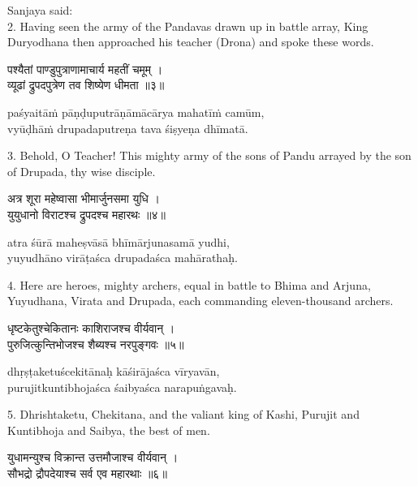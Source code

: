 Sanjaya said: \\
2. Having seen the army of the Pandavas drawn up in battle array, King
Duryodhana then approached his teacher (Drona) and spoke these words.

\begin{gitaverse}
पश्यैतां पाण्डुपुत्राणामाचार्य महतीं चमूम् । \\
व्यूढां द्रुपदपुत्रेण तव शिष्येण धीमता ॥३॥
\end{gitaverse}

\begin{transliteration}
paśyaitāṁ pāṇḍuputrāṇāmācārya mahatīṁ camūm, \\
vyūḍhāṁ drupadaputreṇa tava śiṣyeṇa dhīmatā.
\end{transliteration}

3. Behold, O Teacher! This mighty army of the sons of Pandu arrayed by the son
of Drupada, thy wise disciple.

\begin{gitaverse}
अत्र शूरा महेष्वासा भीमार्जुनसमा युधि । \\
युयुधानो विराटश्च द्रुपदश्च महारथः ॥४॥
\end{gitaverse}

\begin{transliteration}
atra śūrā maheṣvāsā bhīmārjunasamā yudhi, \\
yuyudhāno virāṭaśca drupadaśca mahārathaḥ.
\end{transliteration}

4. Here are heroes, mighty archers, equal in battle to Bhima and Arjuna,
Yuyudhana, Virata and Drupada, each commanding eleven-thousand archers.

\begin{gitaverse}
धृष्टकेतुश्चेकितानः काशिराजश्च वीर्यवान् । \\
पुरुजित्कुन्तिभोजश्च शैब्यश्च नरपुङ्गवः ॥५॥
\end{gitaverse}

\begin{transliteration}
dhṛṣṭaketuścekitānaḥ kāśirājaśca vīryavān, \\
purujitkuntibhojaśca śaibyaśca narapuṅgavaḥ.
\end{transliteration}

5. Dhrishtaketu, Chekitana, and the valiant king of Kashi, Purujit and
Kuntibhoja and Saibya, the best of men.

\begin{gitaverse}
युधामन्युश्च विक्रान्त उत्तमौजाश्च वीर्यवान् । \\
सौभद्रो द्रौपदेयाश्च सर्व एव महारथाः ॥६॥
\end{gitaverse}

